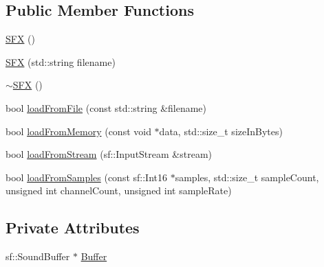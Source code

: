 \subsection*{Public Member Functions}
\begin{DoxyCompactItemize}
\item 
\hyperlink{class_s_f_x_aa88af2470f7f001e98f7dd512c610433}{S\-F\-X} ()
\item 
\hyperlink{class_s_f_x_ab7f079df2d4b684a0ac5246a9356390a}{S\-F\-X} (std\-::string filename)
\item 
\hyperlink{class_s_f_x_a6d123bd5ec64f90e1e8c70e2f15f6fd4}{$\sim$\-S\-F\-X} ()
\item 
bool \hyperlink{class_s_f_x_a52cafd60db60baa07853333c34f05a9c}{load\-From\-File} (const std\-::string \&filename)
\item 
bool \hyperlink{class_s_f_x_acc6b505cf68bbc3619ed7614739fe5bc}{load\-From\-Memory} (const void $\ast$data, std\-::size\-\_\-t size\-In\-Bytes)
\item 
bool \hyperlink{class_s_f_x_a8df4611064786e8daf406197d2c54c0c}{load\-From\-Stream} (sf\-::\-Input\-Stream \&stream)
\item 
bool \hyperlink{class_s_f_x_aedbae5b62b225a4e4d20dbfa11b2f0ec}{load\-From\-Samples} (const sf\-::\-Int16 $\ast$samples, std\-::size\-\_\-t sample\-Count, unsigned int channel\-Count, unsigned int sample\-Rate)
\end{DoxyCompactItemize}
\subsection*{Private Attributes}
\begin{DoxyCompactItemize}
\item 
sf\-::\-Sound\-Buffer $\ast$ \hyperlink{class_s_f_x_ae55cbdae082548b85511de868d03a9f2}{Buffer}
\end{DoxyCompactItemize}


